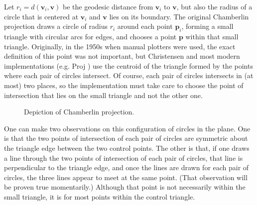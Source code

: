 \documentclass{amsart}[12pt]
\begin{document}
Let $r_i = d(\mathbf v_i, \mathbf v)$ be the geodesic distance from
$\mathbf v_i$ to $\mathbf v$, but also the radius of a circle that is centered
at $\mathbf v_i$ and $\mathbf v$ lies on its boundary. The original Chamberlin
projection draws a circle of radius $r_i$ around each point $\mathbf p_i$,
forming a small triangle with circular arcs for edges, and chooses a point
$\mathbf p$ within that small triangle. Originally, in the 1950s when manual
plotters were used, the exact definition of this point was not important, but Christensen
\cite{christensen} and most modern implementations (e.g. Proj \cite{proj}) use
the centroid of the triangle formed by the points where each pair of circles
intersect. Of course, each pair of circles intersects in (at most) two places,
so the implementation must take care to choose the point of intersection that
lies on the small triangle and not the other one.

\begin{figure}%
\caption{Depiction of Chamberlin projection.}
\label{fig:chamberlin}
\end{figure}

One can make two observations on this configuration of circles in the plane. One
is that the two points of intersection of each pair of circles are symmetric
about the triangle edge between the two control points. The other is that, if
one draws a line through the two points of intersection of each pair of circles,
that line is perpendicular to the triangle edge, and once the lines are drawn
for each pair of circles, the three lines appear to meet at the same point.
(That observation will be proven true momentarily.) Although that point is not
necessarily within the small triangle, it is for most points within the control
triangle.
\end{document}
